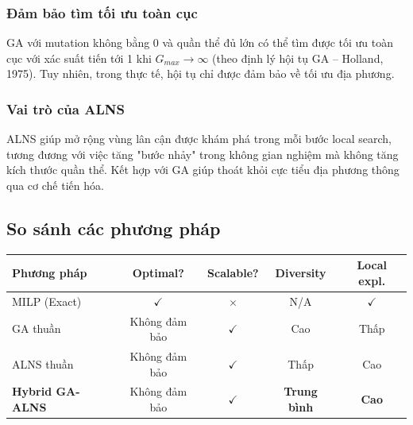 \documentclass[12pt]{article}
\begin{document}
\subsubsection*{Đảm bảo tìm tối ưu toàn cục}

GA với mutation không bằng 0 và quần thể đủ lớn có thể tìm được tối ưu toàn cục với xác suất tiến tới 1 khi $G_{max} \to \infty$ (theo định lý hội tụ GA -- Holland, 1975). Tuy nhiên, trong thực tế, hội tụ chỉ được đảm bảo về tối ưu địa phương.

\subsubsection*{Vai trò của ALNS}

ALNS giúp mở rộng vùng lân cận được khám phá trong mỗi bước local search, tương đương với việc tăng "bước nhảy" trong không gian nghiệm mà không tăng kích thước quần thể. Kết hợp với GA giúp thoát khỏi cực tiểu địa phương thông qua cơ chế tiến hóa.

\subsection{So sánh các phương pháp}

\begin{center}
\begin{tabular}{p{}cccc}
\toprule
\textbf{Phương pháp} & \textbf{Optimal?} & \textbf{Scalable?} & \textbf{Diversity} & \textbf{Local expl.} \\
\midrule
MILP (Exact) & $\checkmark$ & $\times$ & N/A & $\checkmark$ \\
GA thuần & Không đảm bảo & $\checkmark$ & Cao & Thấp \\
ALNS thuần & Không đảm bảo & $\checkmark$ & Thấp & Cao \\
\textbf{Hybrid GA-ALNS} & Không đảm bảo & $\checkmark$ & \textbf{Trung bình} & \textbf{Cao} \\
\bottomrule
\end{tabular}
\end{center}
\end{document}
